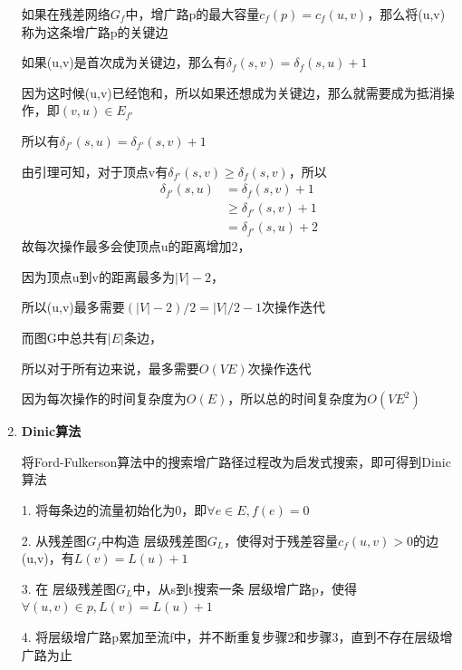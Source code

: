 \documentclass[UTF8]{ctexart}
\begin{document}
\begin{enumerate}
            如果在残差网络$G_f$中，增广路p的最大容量$c_f(p)=c_f(u,v)$，那么将(u,v)称为这条增广路p的关键边

            如果(u,v)是首次成为关键边，那么有$\delta_f(s,v)=\delta_f(s,u)+1$

            因为这时候(u,v)已经饱和，所以如果还想成为关键边，那么就需要成为抵消操作，即$(v,u)\in E_{f'}$

            所以有$\delta_{f'}(s,u)=\delta_{f'}(s,v)+1$

            由引理可知，对于顶点v有$\delta_{f'}(s,v)\ge\delta_f(s,v)$，所以
            $$
                  \begin{aligned}
                        \delta_{f'}(s,u) & =\delta_f(s,v)+1      \\
                                         & \ge\delta_{f'}(s,v)+1 \\
                                         & =\delta_{f'}(s,u)+2
                  \end{aligned}
            $$
            故每次操作最多会使顶点u的距离增加2，
            \vspace{10cm}

            因为顶点u到v的距离最多为$|V|-2$，

            所以(u,v)最多需要$(|V|-2)/2=|V|/2-1$次操作迭代

            而图G中总共有$|E|$条边，

            所以对于所有边来说，最多需要$O(VE)$次操作迭代

            因为每次操作的时间复杂度为$O(E)$，所以总的时间复杂度为$O(VE^2)$


            \vspace{2cm}

      \item

            \textbf{Dinic算法}\cite{dinitz1970algorithm}

            将Ford-Fulkerson算法中的搜索增广路径过程改为启发式搜索，即可得到Dinic算法

            1. 将每条边的流量初始化为0，即$\forall e\in E,f(e)=0$

            2. 从残差图$G_f$中构造 层级残差图$G_L$，使得对于残差容量$c_f(u,v)>0$的边(u,v)，有$L(v)=L(u)+1$

            3. 在 层级残差图$G_L$中，从s到t搜索一条 层级增广路p，使得$\forall (u,v)\in p,L(v)=L(u)+1$

            4. 将层级增广路p累加至流f中，并不断重复步骤2和步骤3，直到不存在层级增广路为止


\end{enumerate}
\end{document}

